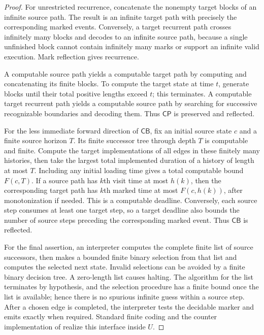 \documentclass[11pt,letterpaper]{article}
\theoremstyle{definition}
\theoremstyle{remark}
\newcommand{\CP}{\mathsf{CP}}
\newcommand{\CB}{\mathsf{CB}}
\newcommand{\1}{\mathbf 1}
\begin{document}
\begin{proof}
For unrestricted recurrence, concatenate the nonempty target blocks of an
infinite source path. The result is an infinite target path with precisely
the corresponding marked events. Conversely, a target recurrent path
crosses infinitely many blocks and decodes to an infinite source path,
because a single unfinished block cannot contain infinitely many marks or
support an infinite valid execution. Mark reflection gives recurrence.

A computable source path yields a computable target path by computing and
concatenating its finite blocks. To compute the target state at time $t$,
generate blocks until their total positive lengths exceed $t$; this
terminates. A computable target recurrent path yields a computable source
path by searching for successive recognizable boundaries and decoding them.
Thus $\CP$ is preserved and reflected.

For the less immediate forward direction of $\CB$, fix an initial source
state $c$ and a finite source horizon $T$. Its finite successor tree through
depth $T$ is computable and finite. Compute the target implementations of
all edges in these finitely many histories, then take the largest total
implemented duration of a history of length at most $T$. Including any
initial loading time gives a total computable bound $F(c,T)$. If a source
path has $k$th visit time at most $h(k)$, then the corresponding target path
has $k$th marked time at most $F(c,h(k))$, after monotonization if needed.
This is a computable deadline. Conversely, each source step consumes at least
one target step, so a target deadline also bounds the number of source
steps preceding the corresponding marked event. Thus $\CB$ is reflected.

For the final assertion, an interpreter computes the complete finite list of
source successors, then makes a bounded finite binary selection from that
list and computes the selected next state. Invalid selections can be
avoided by a finite binary decision tree. A zero-length list causes halting.
The algorithm for the list terminates by hypothesis, and the selection
procedure has a finite bound once the list is available; hence there is no
spurious infinite guess within a source step. After a chosen edge is
completed, the interpreter tests the decidable marker and emits exactly
when required. Standard finite coding and the counter implementation of
 realize this interface inside $U$.
\end{proof}
\end{document}
